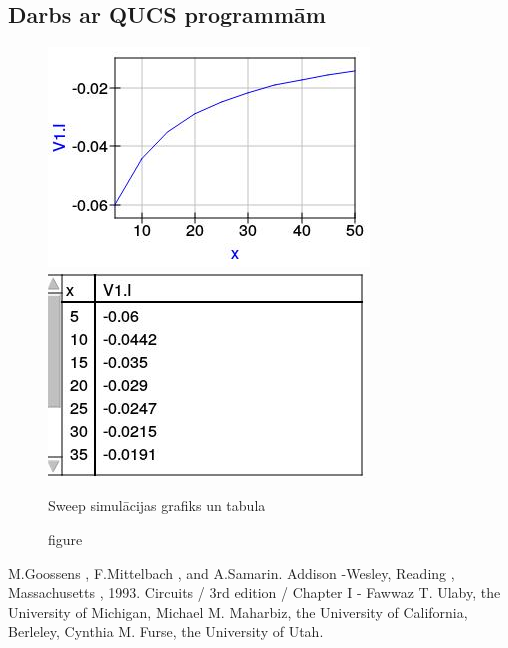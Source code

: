 \documentclass{report}
\begin{document}
\subsection{Darbs ar QUCS programmām}
\begin{figure}[h]
  \includegraphics[width=0.5\linewidth]{grafiks.png}
  \includegraphics[width=0.5\linewidth]{tabula.png}
  \caption{figure}{Sweep simulācijas grafiks un tabula}
\end{figure}

\begin{thebibliography}{9}
M.Goossens , F.Mittelbach , and A.Samarin.
Addison -Wesley, Reading , Massachusetts , 1993.
Circuits / 3rd edition / Chapter I - Fawwaz T. Ulaby, the University of Michigan, Michael M. Maharbiz, the University of California, Berleley, Cynthia M. Furse, the University of Utah.
\end{thebibliography}
\end{document}

